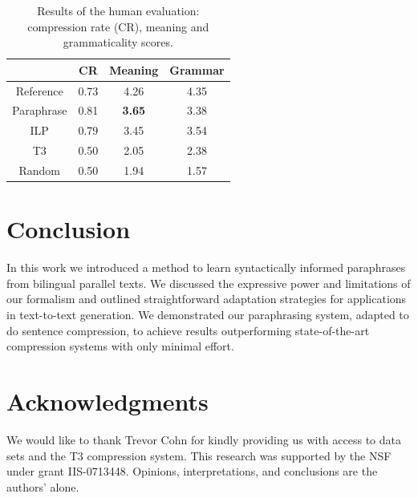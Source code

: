 \documentclass[11pt]{article}
\begin{document}
\begin{table}
\small
\begin{center}
\begin{tabular}{|c|c|c|c|}
  \hline
  & CR & Meaning & Grammar \\
  \hline
  Reference & 0.73 &  4.26 & 4.35 \\
  Paraphrase & 0.81 & {\bf 3.65} & 3.38 \\
  ILP & 0.79 & 3.45 & 3.54 \\
  T3 & 0.50 & 2.05 & 2.38 \\
  Random & 0.50 & 1.94 & 1.57 \\
  \hline
\end{tabular}
\end{center}
\normalsize
\caption{Results of the human evaluation: compression rate (CR),
  meaning and grammaticality scores. 
  }
\label{human_judgments}
\end{table}



\section{Conclusion} \label{conclusion}

In this work we introduced a method to learn syntactically informed
paraphrases from bilingual parallel texts. We discussed the expressive
power and limitations of our formalism and outlined straightforward
adaptation strategies for applications in text-to-text generation. We
demonstrated our paraphrasing system, adapted to do sentence
compression, to achieve results outperforming   state-of-the-art
compression systems with only minimal effort.

\section*{Acknowledgments}
 We would like to thank Trevor Cohn for kindly providing us with
 access to data sets and the T3 compression system.
This research was supported by the NSF under grant IIS-0713448. Opinions, interpretations, and conclusions are the authors' alone.



\end{document}
